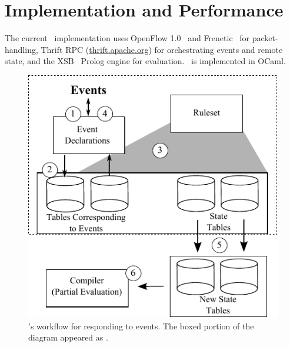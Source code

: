 \section{Implementation and Performance}
\label{sec:impl}

The current \flowlog\ implementation uses OpenFlow
1.0~\cite{McKeown:ccr08-openflow} and 
Frenetic~\cite{foster:icfp11-frenetic} for packet-handling, 
Thrift RPC (\url{thrift.apache.org})
for orchestrating
events and remote state, and the XSB~\cite{sagonas++:sigmod94-xsb} Prolog
engine for evaluation. \flowlog\ is implemented in OCaml.


\begin{figure}
  \centering
\includegraphics[scale=0.95]{figs/eval-cycle.pdf}
\caption{\small \flowlog's workflow for responding to events. The boxed portion of the diagram appeared as .}
\label{fig:workflow}
\end{figure}

